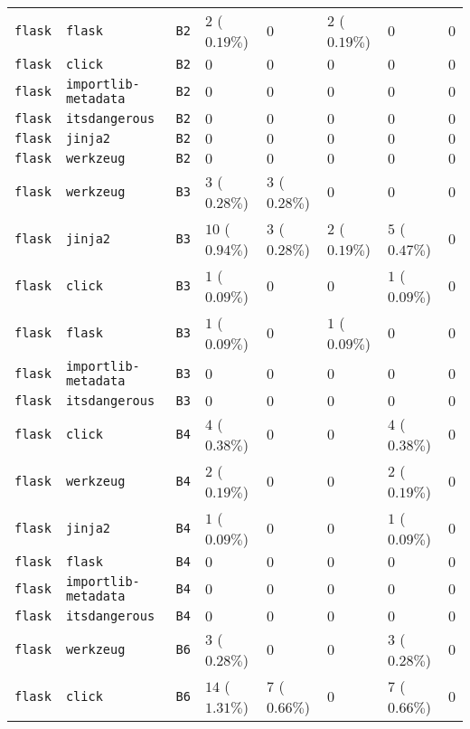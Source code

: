 \begin{table}
\begin{tabular}{llllllll}
\texttt{flask} & \texttt{flask} & \texttt{B2} & $2$ ($0.19\%$) & $0$ & $2$ ($0.19\%$) & $0$ & $0$ \\
\texttt{flask} & \texttt{click} & \texttt{B2} & $0$ & $0$ & $0$ & $0$ & $0$ \\
\texttt{flask} & \texttt{importlib-metadata} & \texttt{B2} & $0$ & $0$ & $0$ & $0$ & $0$ \\
\texttt{flask} & \texttt{itsdangerous} & \texttt{B2} & $0$ & $0$ & $0$ & $0$ & $0$ \\
\texttt{flask} & \texttt{jinja2} & \texttt{B2} & $0$ & $0$ & $0$ & $0$ & $0$ \\
\texttt{flask} & \texttt{werkzeug} & \texttt{B2} & $0$ & $0$ & $0$ & $0$ & $0$ \\
\texttt{flask} & \texttt{werkzeug} & \texttt{B3} & $3$ ($0.28\%$) & $3$ ($0.28\%$) & $0$ & $0$ & $0$ \\
\texttt{flask} & \texttt{jinja2} & \texttt{B3} & $10$ ($0.94\%$) & $3$ ($0.28\%$) & $2$ ($0.19\%$) & $5$ ($0.47\%$) & $0$ \\
\texttt{flask} & \texttt{click} & \texttt{B3} & $1$ ($0.09\%$) & $0$ & $0$ & $1$ ($0.09\%$) & $0$ \\
\texttt{flask} & \texttt{flask} & \texttt{B3} & $1$ ($0.09\%$) & $0$ & $1$ ($0.09\%$) & $0$ & $0$ \\
\texttt{flask} & \texttt{importlib-metadata} & \texttt{B3} & $0$ & $0$ & $0$ & $0$ & $0$ \\
\texttt{flask} & \texttt{itsdangerous} & \texttt{B3} & $0$ & $0$ & $0$ & $0$ & $0$ \\
\texttt{flask} & \texttt{click} & \texttt{B4} & $4$ ($0.38\%$) & $0$ & $0$ & $4$ ($0.38\%$) & $0$ \\
\texttt{flask} & \texttt{werkzeug} & \texttt{B4} & $2$ ($0.19\%$) & $0$ & $0$ & $2$ ($0.19\%$) & $0$ \\
\texttt{flask} & \texttt{jinja2} & \texttt{B4} & $1$ ($0.09\%$) & $0$ & $0$ & $1$ ($0.09\%$) & $0$ \\
\texttt{flask} & \texttt{flask} & \texttt{B4} & $0$ & $0$ & $0$ & $0$ & $0$ \\
\texttt{flask} & \texttt{importlib-metadata} & \texttt{B4} & $0$ & $0$ & $0$ & $0$ & $0$ \\
\texttt{flask} & \texttt{itsdangerous} & \texttt{B4} & $0$ & $0$ & $0$ & $0$ & $0$ \\
\texttt{flask} & \texttt{werkzeug} & \texttt{B6} & $3$ ($0.28\%$) & $0$ & $0$ & $3$ ($0.28\%$) & $0$ \\
\texttt{flask} & \texttt{click} & \texttt{B6} & $14$ ($1.31\%$) & $7$ ($0.66\%$) & $0$ & $7$ ($0.66\%$) & $0$ \\

\end{tabular}
\end{table}
